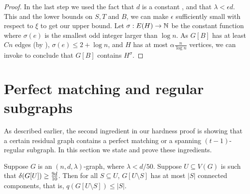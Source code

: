 \documentclass[11pt]{article}
\begin{document}
\begin{proof}
In the last step we used the fact that $d$ is a constant , and that $\lambda < \epsilon d$.   This and the lower bounds on $S,T$ and $B$, we can make $\epsilon$ sufficiently small with respect to $\xi$ to get our upper bound.
    Let $\sigma: E(H) \to \mathbb{N}$ be the constant function where $\sigma(e)$ is the smallest odd integer larger than $\log n$. 
As $G[B]$ has at least $Cn$ edges (by ), $\sigma(e) \le 2 + \log n$, and $H$ has at most $\alpha \frac{n}{\log n}$ vertices, we can invoke  to conclude that $G[B]$ contains $H^\sigma$.
\end{proof}

\section{Perfect matching and regular subgraphs}
\label{sec:matching-machinery}
As described earlier, the second ingredient in our hardness proof is showing that a certain residual graph contains a perfect matching or a spanning $(t-1)$-regular subgraph. In this section we state and prove these ingredients.

\begin{lemma}\label{thm:perfect-matching}
Suppose $G$ is an $(n, d, \lambda)$-graph, where $\lambda < d/50$. 
Suppose $U \subseteq V(G)$ is such that $\delta(G[U]) \ge \frac{9d}{10}$. Then for all $S \subseteq U$, $G[U \setminus S]$ has at most $|S|$ connected components, that is, $q(G[U \setminus S]) \le |S|$.
\end{lemma}
\end{document}
